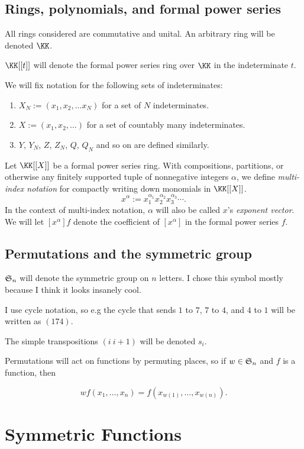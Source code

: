 \documentclass{article}
\newcommand{\frkS}{\ensuremath\mathfrak{S}}
\begin{document}
\subsection*{Rings, polynomials, and formal power series}

All rings considered are commutative and unital. An arbitrary ring will be denoted $\KK$. 

$\KK[[t]]$ will denote the formal power series ring over $\KK$ in the indeterminate $t$.

We will fix notation for the following sets of indeterminates:
\begin{enumerate}[label=(\alph*)]
    \item $X_N := (x_1, x_2, \ldots x_N)$ for a set of $N$ indeterminates.
    \item $X := (x_1, x_2, \ldots)$ for a set of countably many indeterminates.
    \item $Y$, $Y_N$, $Z$, $Z_N$, $Q$, $Q_N$ and so on are defined similarly.
\end{enumerate}

Let $\KK[[X]]$ be a formal power series ring. With compositions, partitions, or otherwise any finitely supported tuple of nonnegative integers $\alpha$, we define \textit{multi-index notation} for compactly writing down monomials in $\KK[[X]]$.
\[
    x^\alpha := x_1^{\alpha_1}x_2^{\alpha_2}x_3^{\alpha_3}\cdots.
\]
In the context of multi-index notation, $\alpha$ will also be called $x$'s \textit{exponent vector}.
We will let $[x^\alpha]f$ denote the coefficient of $[x^\alpha]$ in the formal power series $f$.

\subsection*{Permutations and the symmetric group}

$\frkS_n$ will denote the symmetric group on $n$ letters. I chose this symbol mostly because I think it looks insanely cool.

I use cycle notation, so e.g the cycle that sends $1$ to $7$, $7$ to $4$, and $4$ to $1$ will be written as $(174)$.

The simple transpositions $(i\:i+1)$ will be denoted $s_i$.

Permutations will act on functions by permuting places, so if $w \in \frkS_n$ and $f$ is a function, then

\[
    wf(x_1,\ldots,x_n) = f(x_{w(1)},\ldots,x_{w(n)}).
\]

\section{Symmetric Functions}
\end{document}
